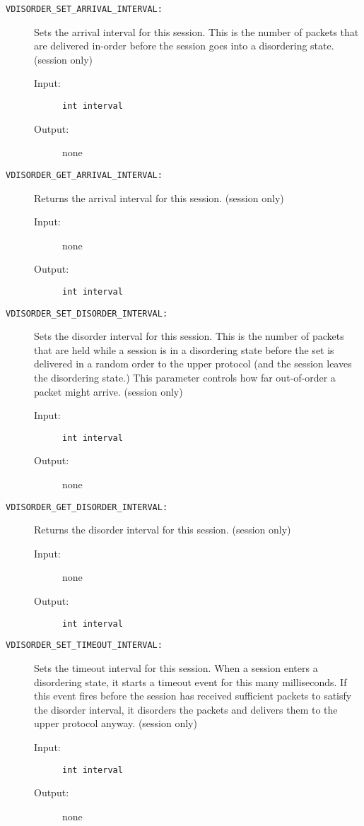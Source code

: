 \begin{description}

\item[{\tt VDISORDER\_SET\_ARRIVAL\_INTERVAL:}]
Sets the arrival interval for this session.  This is the number of
packets that are delivered in-order before the session goes into a
disordering state.  
(session only)
\begin{description}
\item[{\rm Input:}] {\tt int interval}
\item[{\rm Output:}] none
\end{description}


\item[{\tt VDISORDER\_GET\_ARRIVAL\_INTERVAL:}]
Returns the arrival interval for this session.  
(session only)
\begin{description}
\item[{\rm Input:}] none
\item[{\rm Output:}] {\tt int interval}
\end{description}


\item[{\tt VDISORDER\_SET\_DISORDER\_INTERVAL:}]
Sets the disorder interval for this session.  This is the number of
packets that are held while a session is in a disordering state before 
the set is delivered in a random order to the upper protocol (and the
session leaves the disordering state.)  This
parameter controls how far out-of-order a packet might arrive.
(session only)
\begin{description}
\item[{\rm Input:}] {\tt int interval}
\item[{\rm Output:}] none
\end{description}


\item[{\tt VDISORDER\_GET\_DISORDER\_INTERVAL:}]
Returns the disorder interval for this session.  
(session only)
\begin{description}
\item[{\rm Input:}] none
\item[{\rm Output:}] {\tt int interval}
\end{description}


\item[{\tt VDISORDER\_SET\_TIMEOUT\_INTERVAL:}]
Sets the timeout interval for this session.  When a session enters a
disordering state, it starts a timeout event for this many
milliseconds.  If this event fires before the session has received sufficient
packets to satisfy the disorder interval, it disorders the packets and
delivers them to the upper protocol anyway.  
(session only)
\begin{description}
\item[{\rm Input:}] {\tt int interval}
\item[{\rm Output:}] none
\end{description}


\end{description}
